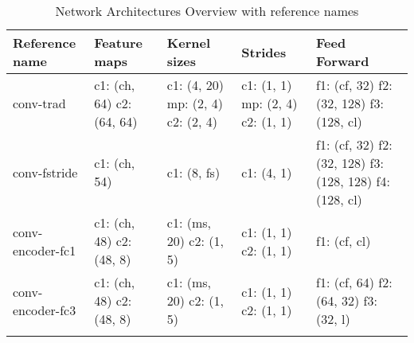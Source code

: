 \begin{table}[ht!]
\begin{center}
\caption{Network Architectures Overview with reference names}
\begin{tabular}{ M{2.5cm}  M{2.1cm}  M{2.1cm} M{2.1cm} M{2.5cm}}
\toprule
\textbf{Reference name} & \textbf{Feature maps} & \textbf{Kernel sizes} & \textbf{Strides} & \textbf{Feed Forward} \\
\midrule
conv-trad & c1: (ch, 64) c2: (64, 64) & c1: (4, 20) mp: (2, 4) c2: (2, 4) & c1: (1, 1) mp: (2, 4) c2: (1, 1) & f1: (cf, 32) \quad f2: (32, 128) f3: (128, cl)\\
\midrule
conv-fstride & c1: (ch, 54) & c1: (8, fs) & c1: (4, 1) & f1: (cf, 32) \quad f2: (32, 128) \quad f3: (128, 128) \quad f4: (128, cl)\\
\midrule
conv-encoder-fc1 & c1: (ch, 48) \quad c2: (48, 8) & c1: (ms, 20) \quad c2: (1, 5) & c1: (1, 1) \quad c2: (1, 1) & f1: (cf, cl)\\
\midrule
conv-encoder-fc3 & c1: (ch, 48) \quad c2: (48, 8) & c1: (ms, 20) \quad c2: (1, 5) & c1: (1, 1) \quad c2: (1, 1) & f1: (cf, 64) \quad f2: (64, 32) \quad f3: (32, l)\\
\bottomrule
\label{tab:nn_arch_overview}
\end{tabular}
\end{center}
\end{table}
\FloatBarrier
\noindent

